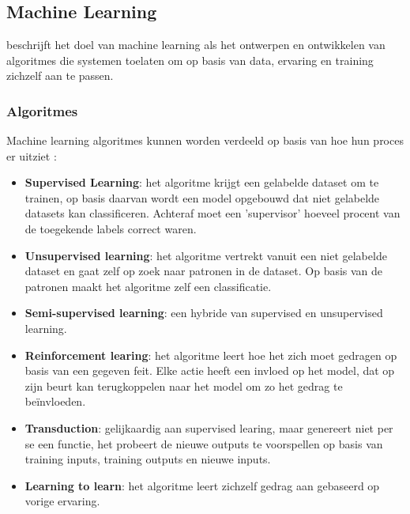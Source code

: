 \chapter{}%
\label{ch:stand-van-zaken}


\section{Machine Learning}
\textcite{Hu2013} beschrijft het doel van machine learning als het ontwerpen en ontwikkelen van algoritmes die systemen toelaten om op basis van data, ervaring en training zichzelf aan te passen. 
\subsection{Algoritmes}
Machine learning algoritmes kunnen worden verdeeld op basis van hoe hun proces er uitziet :
\begin{itemize}
    \item \textbf{Supervised Learning}: het algoritme krijgt een gelabelde dataset om te trainen, op basis daarvan wordt een model opgebouwd dat niet gelabelde datasets kan classificeren. Achteraf moet een 'supervisor' hoeveel procent van de toegekende labels correct waren. 
    \item \textbf{Unsupervised learning}: het algoritme vertrekt vanuit een niet gelabelde dataset en gaat zelf op zoek naar patronen in de dataset. Op basis van de patronen maakt het algoritme zelf een classificatie.
    \item \textbf{Semi-supervised learning}: een hybride van supervised en unsupervised learning.
    \item \textbf{Reinforcement learing}: het algoritme leert hoe het zich moet gedragen op basis van een gegeven feit. Elke actie heeft een invloed op het model, dat op zijn beurt kan terugkoppelen naar het model om zo het gedrag te beïnvloeden.
    \item \textbf{Transduction}: gelijkaardig aan supervised learing, maar genereert niet per se een functie, het probeert de nieuwe outputs te voorspellen op basis van training inputs, training outputs en nieuwe inputs.
    \item \textbf{Learning to learn}: het algoritme leert zichzelf gedrag aan gebaseerd op vorige ervaring.
\end{itemize}
\autocite{Zhang2010}


